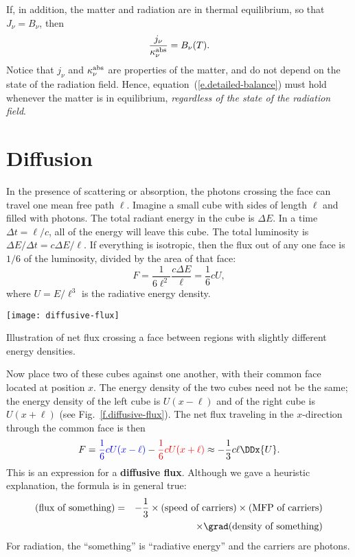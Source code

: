 If, in addition, the matter and radiation are in thermal equilibrium, so that $J_{\nu} = B_{\nu}$, then
\begin{equation}\label{e.detailed-balance}
\frac{j_{\nu}}{\kappa_\nu^{\mathrm{abs}}} = B_{\nu}(T).
\end{equation}
Notice that $j_{\nu}$ and $\kappa_\nu^{\mathrm{abs}}$ are properties of the matter, and do not depend on the state of the radiation field. Hence, equation~(\ref{e.detailed-balance}) must hold whenever the matter is in equilibrium, \emph{regardless of the state of the radiation field}.

\section{Diffusion}\label{s.diffusion}

In the presence of scattering or absorption, the photons crossing the face can travel one mean free path $\ell$. Imagine a small cube with sides of length $\ell$ and filled with photons. The total radiant energy in the cube is $\Delta E$. In a time $\Delta t = \ell/c$, all of the energy will leave this cube. The total luminosity is $\Delta E/\Delta t = c\Delta E/\ell$. If everything is isotropic, then the flux out of any one face is $1/6$ of the luminosity, divided by the area of that face:
\[
	F = \frac{1}{6\ell^{2}}\frac{c\Delta E}{\ell} = \frac{1}{6}c U,
\]
where $U = E/\ell^{3}$ is the radiative energy density. 

\begin{marginfigure}
\texttt{[image: diffusive-flux]}
\caption{\label{f.diffusive-flux} Illustration of net flux crossing a face between regions with slightly different energy densities.}
\end{marginfigure}
Now place two of these cubes against one another, with their common face located at position $x$. The energy density of the two cubes need not be the same; the energy density of the left cube is $U(x-\ell)$ and of the right cube is $U(x+\ell)$ (see Fig.~\ref{f.diffusive-flux}). The net flux traveling in the $x$-direction through the common face is then
\[
	F = {\color{blue}\frac{1}{6} c U(x-\ell)} - {\color{red}\frac{1}{6} c U(x+\ell)} \approx -\frac{1}{3}c\ell \DDx{U}.
\]
This is an expression for a \textbf{diffusive flux}. Although we gave a heuristic explanation, the formula is in general true:
\begin{eqnarray}
\nonumber
(\textrm{flux of something}) &=& -\frac{1}{3}\times(\textrm{speed of carriers})\times(\textrm{MFP of carriers})\\
&&\times \grad(\textrm{density of something})
\label{e.diffusive-flux}
\end{eqnarray}
For radiation, the ``something'' is ``radiative energy'' and the carriers are photons.

